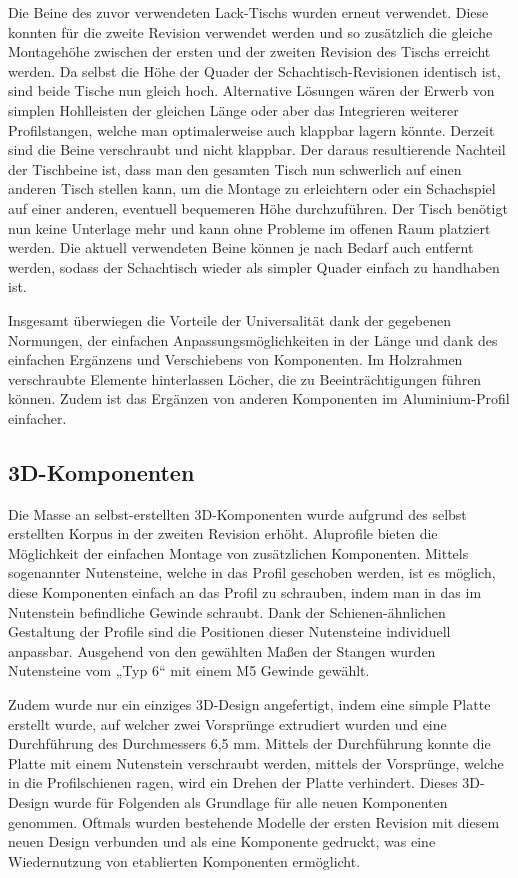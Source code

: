 Die Beine des zuvor verwendeten Lack-Tischs wurden erneut verwendet.
Diese konnten für die zweite Revision verwendet werden und so zusätzlich
die gleiche Montagehöhe zwischen der ersten und der zweiten Revision des
Tischs erreicht werden. Da selbst die Höhe der Quader der
Schachtisch-Revisionen identisch ist, sind beide Tische nun gleich hoch.
Alternative Lösungen wären der Erwerb von simplen Hohlleisten der
gleichen Länge oder aber das Integrieren weiterer Profilstangen, welche
man optimalerweise auch klappbar lagern könnte. Derzeit sind die Beine
verschraubt und nicht klappbar. Der daraus resultierende Nachteil der
Tischbeine ist, dass man den gesamten Tisch nun schwerlich auf einen
anderen Tisch stellen kann, um die Montage zu erleichtern oder ein
Schachspiel auf einer anderen, eventuell bequemeren Höhe durchzuführen.
Der Tisch benötigt nun keine Unterlage mehr und kann ohne Probleme im
offenen Raum platziert werden. Die aktuell verwendeten Beine können je
nach Bedarf auch entfernt werden, sodass der Schachtisch wieder als
simpler Quader einfach zu handhaben ist.

Insgesamt überwiegen die Vorteile der Universalität dank der gegebenen
Normungen, der einfachen Anpassungsmöglichkeiten in der Länge und dank
des einfachen Ergänzens und Verschiebens von Komponenten. Im Holzrahmen
verschraubte Elemente hinterlassen Löcher, die zu Beeinträchtigungen
führen können. Zudem ist das Ergänzen von anderen Komponenten im
Aluminium-Profil einfacher.

\hypertarget{d-komponenten}{%
\subsection{3D-Komponenten}\label{d-komponenten}}

Die Masse an selbst-erstellten 3D-Komponenten wurde aufgrund des selbst
erstellten Korpus in der zweiten Revision erhöht. Aluprofile bieten die
Möglichkeit der einfachen Montage von zusätzlichen Komponenten. Mittels
sogenannter Nutensteine, welche in das Profil geschoben werden, ist es
möglich, diese Komponenten einfach an das Profil zu schrauben, indem man
in das im Nutenstein befindliche Gewinde schraubt. Dank der
Schienen-ähnlichen Gestaltung der Profile sind die Positionen dieser
Nutensteine individuell anpassbar. Ausgehend von den gewählten Maßen der
Stangen wurden Nutensteine vom „Typ 6`` mit einem M5 Gewinde gewählt.

Zudem wurde nur ein einziges 3D-Design angefertigt, indem eine simple
Platte erstellt wurde, auf welcher zwei Vorsprünge extrudiert wurden und
eine Durchführung des Durchmessers 6,5 mm. Mittels der Durchführung
konnte die Platte mit einem Nutenstein verschraubt werden, mittels der
Vorsprünge, welche in die Profilschienen ragen, wird ein Drehen der
Platte verhindert. Dieses 3D-Design wurde für Folgenden als Grundlage
für alle neuen Komponenten genommen. Oftmals wurden bestehende Modelle
der ersten Revision mit diesem neuen Design verbunden und als eine
Komponente gedruckt, was eine Wiedernutzung von etablierten Komponenten
ermöglicht.


